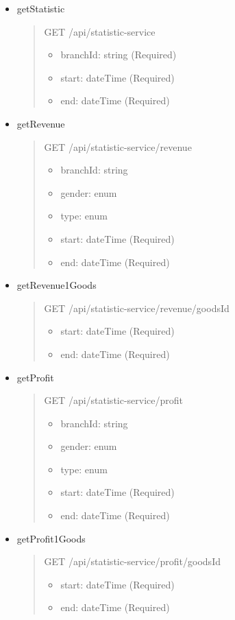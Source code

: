 \begin{itemize}
	\item getStatistic
	\begin{quote}
		GET /api/statistic-service
		\begin{itemize}
			\item branchId: string (Required)
			\item start: dateTime (Required)
			\item end: dateTime (Required)
		\end{itemize}
	\end{quote}

	\item getRevenue
	\begin{quote}
		GET /api/statistic-service/revenue
		\begin{itemize}
			\item branchId: string
			\item gender: enum
			\item type: enum
			\item start: dateTime (Required)	
			\item end: dateTime (Required)
		\end{itemize}
	\end{quote}

	\item getRevenue1Goods
	\begin{quote}
		GET /api/statistic-service/revenue/{goodsId}
		\begin{itemize}
			\item start: dateTime (Required)	
			\item end: dateTime (Required)
		\end{itemize}
	\end{quote}

	\item getProfit
	\begin{quote}
		GET /api/statistic-service/profit
		\begin{itemize}
			\item branchId: string
			\item gender: enum
			\item type: enum
			\item start: dateTime (Required)	
			\item end: dateTime (Required)
		\end{itemize}
	\end{quote}

	\item getProfit1Goods
	\begin{quote}
		GET /api/statistic-service/profit/{goodsId}
		\begin{itemize}
			\item start: dateTime (Required)	
			\item end: dateTime (Required)
		\end{itemize}
	\end{quote}

\end{itemize}






